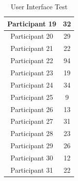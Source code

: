 \begin{table}[htbp]
\begin{tabular}{|c|c|}
    Participant 19             & 32                                \\ \hline
    Participant 20             & 29                                \\ \hline
    Participant 21             & 22                                \\ \hline
    Participant 22             & 94                                \\ \hline
    Participant 23             & 19                                \\ \hline
    Participant 24             & 34                                \\ \hline
    Participant 25             & 9                                \\ \hline
    Participant 26             & 13                                \\ \hline
    Participant 27             & 31                                \\ \hline
    Participant 28             & 23                                \\ \hline
    Participant 29             & 26                                \\ \hline
    Participant 30             & 12                                \\ \hline
    Participant 31             & 22                                  \\ \hline
    \end{tabular}
    \caption{User Interface Test}
    \label{fig:heatmapTimes}
    \end{table}


